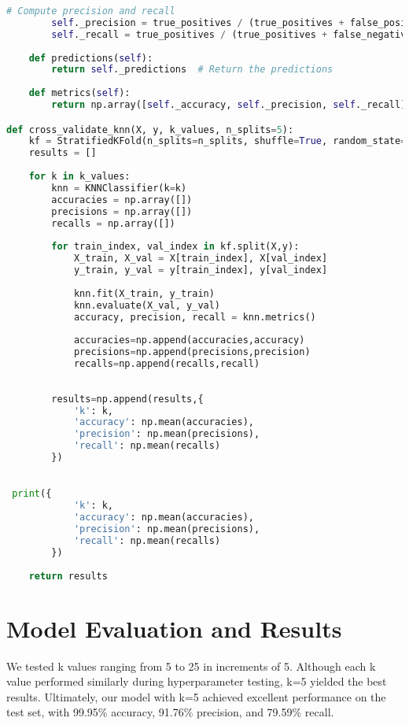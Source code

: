 \documentclass{article}
\begin{document}
\begin{lstlisting}[language=Python, caption=Model Implementation]
        # Compute precision and recall
        self._precision = true_positives / (true_positives + false_positives) if (true_positives + false_positives) > 0 else 0
        self._recall = true_positives / (true_positives + false_negatives) if (true_positives + false_negatives) > 0 else 0
        
    def predictions(self):
        return self._predictions  # Return the predictions
    
    def metrics(self):
        return np.array([self._accuracy, self._precision, self._recall])  # Return the metrics as an array

def cross_validate_knn(X, y, k_values, n_splits=5):
    kf = StratifiedKFold(n_splits=n_splits, shuffle=True, random_state=42)
    results = []
    
    for k in k_values:
        knn = KNNClassifier(k=k)
        accuracies = np.array([])
        precisions = np.array([])
        recalls = np.array([])
        
        for train_index, val_index in kf.split(X,y):
            X_train, X_val = X[train_index], X[val_index]
            y_train, y_val = y[train_index], y[val_index]
            
            knn.fit(X_train, y_train)
            knn.evaluate(X_val, y_val)
            accuracy, precision, recall = knn.metrics()
            
            accuracies=np.append(accuracies,accuracy)
            precisions=np.append(precisions,precision)
            recalls=np.append(recalls,recall)
            
        
        results=np.append(results,{
            'k': k,
            'accuracy': np.mean(accuracies),
            'precision': np.mean(precisions),
            'recall': np.mean(recalls)
        })
       

 print({
            'k': k,
            'accuracy': np.mean(accuracies),
            'precision': np.mean(precisions),
            'recall': np.mean(recalls)
        })
    
    return results
\end{lstlisting}

\section{Model Evaluation and Results}

We tested k values ranging from 5 to 25 in increments of 5. Although each k value performed similarly during hyperparameter testing, k=5 yielded the best results. Ultimately, our model with k=5 achieved excellent performance on the test set, with 99.95\% accuracy, 91.76\% precision, and 79.59\% recall.
\end{document}
